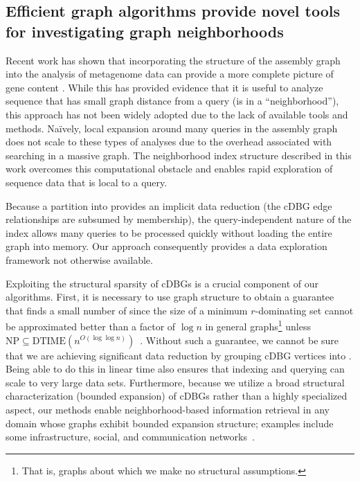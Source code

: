 \subsection*{Efficient graph algorithms provide novel tools for investigating graph neighborhoods}

Recent work has shown that incorporating the structure of the assembly graph into the analysis of metagenome
data can provide a more complete picture of gene content \cite{perchlorate,metacherchant}. While this has provided evidence that it is
useful to analyze sequence that has small graph distance from a query (is in a ``neighborhood''), this approach
has not been widely adopted due to the lack of available tools and methods.
Na\"ively, local expansion around many queries in the assembly graph does not scale to these types of analyses
due to the overhead associated with searching
in a massive graph. The neighborhood index structure described in this work overcomes this computational
obstacle and enables rapid exploration of sequence data that is local to a query.

Because a partition into \pieces provides an implicit data reduction (the cDBG edge relationships are subsumed by \piece membership), the query-independent nature of the index allows many queries to be processed quickly without loading the entire graph into memory.
Our approach consequently provides a data exploration framework not otherwise available.

Exploiting the structural sparsity of cDBGs is a crucial component of our
algorithms. First, it is necessary to use graph structure to obtain a guarantee
that  finds a small number of \pieces since the size
of a minimum $r$-dominating set cannot be approximated better than a factor of
$\log n$ in general graphs\footnote{That is, graphs about which we make no
structural assumptions.} unless $\text{NP}\subseteq \text{DTIME}(n^{O(\log \log
n)})$~\cite{chlebik2008approximation}. Without such a guarantee, we cannot be
sure that we are achieving significant data reduction by grouping cDBG vertices
into \pieces. Being able to do this in linear time also ensures that
indexing and querying can scale to very large data sets. Furthermore, because we
utilize a broad structural characterization (bounded expansion) of cDBGs rather than a
highly specialized aspect, our methods enable neighborhood-based
information retrieval in any domain whose graphs exhibit bounded expansion
structure; examples include some infrastructure,
social, and communication networks~\cite{demaine2014structural,felixThesis,wcol2018}.


